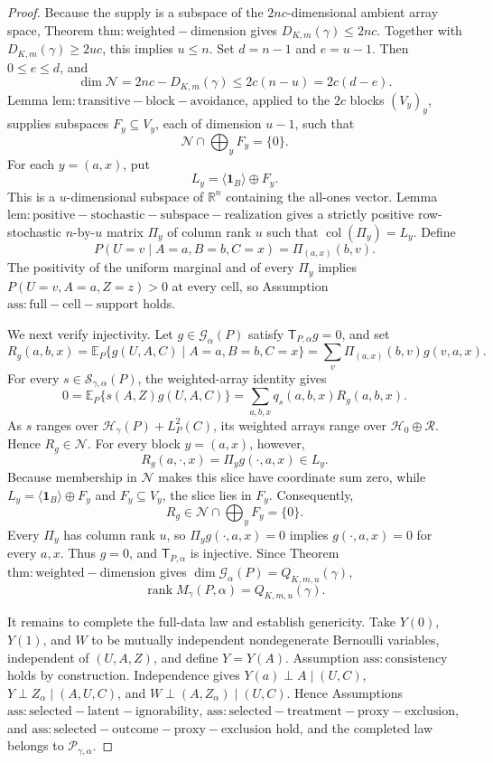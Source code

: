 \documentclass{article}
\begin{document}
\begin{proof}
Because the supply is a subspace of the \(2nc\)-dimensional ambient array space, Theorem \(\mathrm{thm:weighted-dimension}\) gives \(D_{K,m}(\gamma)\le2nc\). Together with \(D_{K,m}(\gamma)\ge2uc\), this implies \(u\le n\). Set \(d=n-1\) and \(e=u-1\). Then \(0\le e\le d\), and
\[\dim\mathcal N=2nc-D_{K,m}(\gamma)\le2c(n-u)=2c(d-e).\]
Lemma \(\mathrm{lem:transitive-block-avoidance}\), applied to the \(2c\) blocks \((V_y)_y\), supplies subspaces \(F_y\subseteq V_y\), each of dimension \(u-1\), such that
\[\mathcal N\cap\bigoplus_yF_y=\{0\}.\]
For each \(y=(a,x)\), put
\[L_y=\langle\mathbf1_B\rangle\oplus F_y.\]
This is a \(u\)-dimensional subspace of \(\mathbb R^n\) containing the all-ones vector. Lemma \(\mathrm{lem:positive-stochastic-subspace-realization}\) gives a strictly positive row-stochastic \(n\)-by-\(u\) matrix \(\Pi_y\) of column rank \(u\) such that \(\operatorname{col}(\Pi_y)=L_y\). Define
\[P(U=v\mid A=a,B=b,C=x)=\Pi_{(a,x)}(b,v).\]
The positivity of the uniform marginal and of every \(\Pi_y\) implies \(P(U=v,A=a,Z=z)>0\) at every cell, so Assumption \(\mathrm{ass:full-cell-support}\) holds.

We next verify injectivity. Let \(g\in\mathcal G_\alpha(P)\) satisfy \(\mathsf T_{P,\alpha}g=0\), and set
\[R_g(a,b,x)=\mathbb E_P\{g(U,A,C)\mid A=a,B=b,C=x\}=\sum_v\Pi_{(a,x)}(b,v)g(v,a,x).\]
For every \(s\in\mathcal S_{\gamma,\alpha}(P)\), the weighted-array identity gives
\[0=\mathbb E_P\{s(A,Z)g(U,A,C)\}=\sum_{a,b,x}q_s(a,b,x)R_g(a,b,x).\]
As \(s\) ranges over \(\mathcal H_\gamma(P)+L_P^2(C)\), its weighted arrays range over \(\mathcal H_0\oplus\mathcal R\). Hence \(R_g\in\mathcal N\). For every block \(y=(a,x)\), however,
\[R_g(a,\cdot,x)=\Pi_y g(\cdot,a,x)\in L_y.\]
Because membership in \(\mathcal N\) makes this slice have coordinate sum zero, while \(L_y=\langle\mathbf1_B\rangle\oplus F_y\) and \(F_y\subseteq V_y\), the slice lies in \(F_y\). Consequently,
\[R_g\in\mathcal N\cap\bigoplus_yF_y=\{0\}.\]
Every \(\Pi_y\) has column rank \(u\), so \(\Pi_y g(\cdot,a,x)=0\) implies \(g(\cdot,a,x)=0\) for every \(a,x\). Thus \(g=0\), and \(\mathsf T_{P,\alpha}\) is injective. Since Theorem \(\mathrm{thm:weighted-dimension}\) gives \(\dim\mathcal G_\alpha(P)=Q_{K,m,u}(\gamma)\),
\[\operatorname{rank}M_\gamma(P,\alpha)=Q_{K,m,u}(\gamma).\]

It remains to complete the full-data law and establish genericity. Take \(Y(0)\), \(Y(1)\), and \(W\) to be mutually independent nondegenerate Bernoulli variables, independent of \((U,A,Z)\), and define \(Y=Y(A)\). Assumption \(\mathrm{ass:consistency}\) holds by construction. Independence gives \(Y(a)\perp A\mid(U,C)\), \(Y\perp Z_\alpha\mid(A,U,C)\), and \(W\perp(A,Z_\alpha)\mid(U,C)\). Hence Assumptions \(\mathrm{ass:selected-latent-ignorability}\), \(\mathrm{ass:selected-treatment-proxy-exclusion}\), and \(\mathrm{ass:selected-outcome-proxy-exclusion}\) hold, and the completed law belongs to \(\mathcal P_{\gamma,\alpha}\).


\end{proof}
\end{document}
